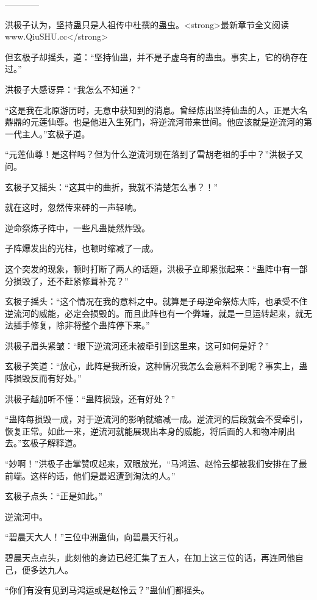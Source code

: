 
\begin{this_body}

------------

洪极子认为，坚持蛊只是人祖传中杜撰的蛊虫。<strong>最新章节全文阅读www.QiuSHU.cc</strong>

但玄极子却摇头，道：“坚持仙蛊，并不是子虚乌有的蛊虫。事实上，它的确存在过。”

洪极子大感讶异：“我怎么不知道？”

“这是我在北原游历时，无意中获知到的消息。曾经炼出坚持仙蛊的人，正是大名鼎鼎的元莲仙尊。也是他进入生死门，将逆流河带来世间。他应该就是逆流河的第一代主人。”玄极子道。

“元莲仙尊！是这样吗？但为什么逆流河现在落到了雪胡老祖的手中？”洪极子又问。

玄极子又摇头：“这其中的曲折，我就不清楚怎么事？！”

就在这时，忽然传来砰的一声轻响。

逆命祭炼子阵中，一些凡蛊陡然炸毁。

子阵爆发出的光柱，也顿时缩减了一成。

这个突发的现象，顿时打断了两人的话题，洪极子立即紧张起来：“蛊阵中有一部分损毁了，还不赶紧修葺补充？”

玄极子摇头：“这个情况在我的意料之中。就算是子母逆命祭炼大阵，也承受不住逆流河的威能，必定会损毁的。而且此阵也有一个弊端，就是一旦运转起来，就无法插手修复，除非将整个蛊阵停下来。”

洪极子眉头紧皱：“眼下逆流河还未被牵引到这里来，这可如何是好？”

玄极子笑道：“放心，此阵是我所设，这种情况我怎么会意料不到呢？事实上，蛊阵损毁反而有好处。”

洪极子越加听不懂：“蛊阵损毁，还有好处？”

“蛊阵每损毁一成，对于逆流河的影响就缩减一成。逆流河的后段就会不受牵引，恢复正常。如此一来，逆流河就能展现出本身的威能，将后面的人和物冲刷出去。”玄极子解释道。

“妙啊！”洪极子击掌赞叹起来，双眼放光，“马鸿运、赵怜云都被我们安排在了最前端。这样的话，他们是最迟遭到淘汰的人。”

玄极子点头：“正是如此。”

逆流河中。

“碧晨天大人！”三位中洲蛊仙，向碧晨天行礼。

碧晨天点点头，此刻他的身边已经汇集了五人，在加上这三位的话，再连同他自己，便多达九人。

“你们有没有见到马鸿运或是赵怜云？”蛊仙们都摇头。


\end{this_body}
